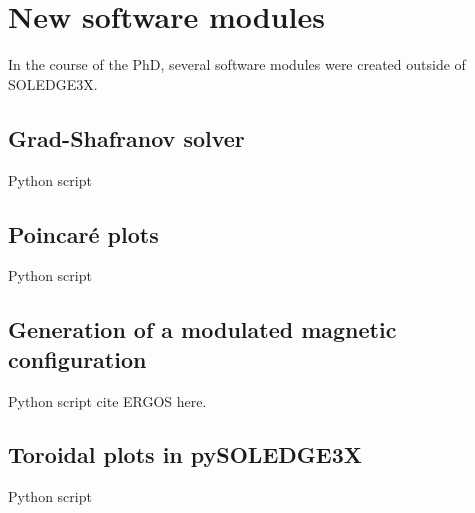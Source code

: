 \chapter{New software modules}
\label{chap:newModules}
In the course of the PhD, several software modules were created outside of SOLEDGE3X.

\section{Grad-Shafranov solver}
\label{sec:app_GradShafranovSolver}
Python script


\section{Poincaré plots}
\label{sec:app_PoincarePlots}
Python script

\section{Generation of a modulated magnetic configuration}
\label{sec:app_rippleGeneration}
Python script
cite ERGOS here. 

\section{Toroidal plots in pySOLEDGE3X}
\label{sec:app_toroidalPlots}
Python script
